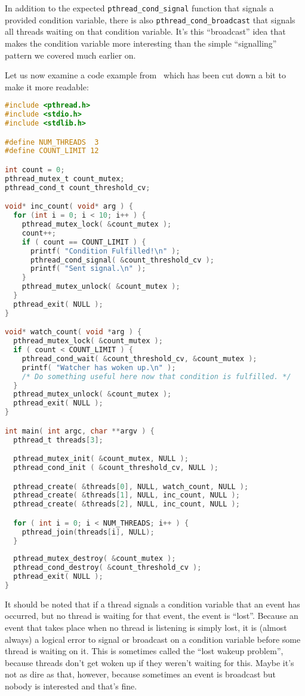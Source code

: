 In addition to the expected \texttt{pthread\_cond\_signal} function that signals a provided condition variable, there is also \texttt{pthread\_cond\_broadcast} that signals all threads waiting on that condition variable. It's this ``broadcast'' idea that makes the condition variable more interesting than the simple ``signalling'' pattern we covered much earlier on.


Let us now examine a code example from~\cite{pthreads} which has been cut down a bit to make it more readable:

\begin{lstlisting}[language=C]
#include <pthread.h>
#include <stdio.h>
#include <stdlib.h>

#define NUM_THREADS  3
#define COUNT_LIMIT 12

int count = 0;
pthread_mutex_t count_mutex;
pthread_cond_t count_threshold_cv;

void* inc_count( void* arg ) {
  for (int i = 0; i < 10; i++ ) {
    pthread_mutex_lock( &count_mutex );
    count++;
    if ( count == COUNT_LIMIT ) {
      printf( "Condition Fulfilled!\n" );
      pthread_cond_signal( &count_threshold_cv );
      printf( "Sent signal.\n" );
    }
    pthread_mutex_unlock( &count_mutex );
  }
  pthread_exit( NULL );
}

void* watch_count( void *arg ) {
  pthread_mutex_lock( &count_mutex );  
  if ( count < COUNT_LIMIT ) {
    pthread_cond_wait( &count_threshold_cv, &count_mutex );
    printf( "Watcher has woken up.\n" );
    /* Do something useful here now that condition is fulfilled. */
  }
  pthread_mutex_unlock( &count_mutex );
  pthread_exit( NULL );
}

int main( int argc, char **argv ) {
  pthread_t threads[3];

  pthread_mutex_init( &count_mutex, NULL );
  pthread_cond_init ( &count_threshold_cv, NULL );

  pthread_create( &threads[0], NULL, watch_count, NULL );
  pthread_create( &threads[1], NULL, inc_count, NULL );
  pthread_create( &threads[2], NULL, inc_count, NULL );

  for ( int i = 0; i < NUM_THREADS; i++ ) {
    pthread_join(threads[i], NULL);
  }
  
  pthread_mutex_destroy( &count_mutex );
  pthread_cond_destroy( &count_threshold_cv );
  pthread_exit( NULL );
}
\end{lstlisting}

It should be noted that if a thread signals a condition variable that an event has occurred, but no thread is waiting for that event, the event is ``lost''.  Because an event that takes place when no thread is listening is simply lost, it is (almost always) a logical error to signal or broadcast on a condition variable before some thread is waiting on it. This is sometimes called the ``lost wakeup problem'', because threads don't get woken up if they weren't waiting for this. Maybe it's not as dire as that, however, because sometimes an event is broadcast but nobody is interested and that's fine.

